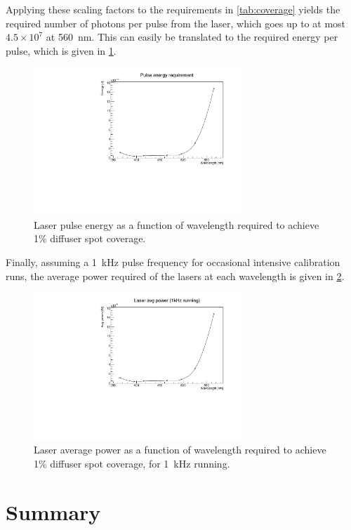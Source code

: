 \documentclass[a4paper,11pt]{article}
\begin{document}
Applying these scaling factors to the requirements in \cref{tab:coverage} yields the required number of photons per pulse from the laser, which goes up to at most $4.5\times10^7$ at 560~nm. This can easily be translated to the required energy per pulse, which is given in \cref{fig:laserenergy}.
\begin{figure}
\centering
\includegraphics[width=0.7\textwidth]{pulseEnergyReqHigh.pdf}
\caption{Laser pulse energy as a function of wavelength required to achieve 1\% diffuser spot coverage.}\label{fig:laserenergy}
\end{figure}
Finally, assuming a 1~kHz pulse frequency for occasional intensive calibration runs, the average power required of the lasers at each wavelength is given in \cref{fig:laserpower}.
\begin{figure}
\centering
\includegraphics[width=0.7\textwidth]{avgPowerReqHigh.pdf}
\caption{Laser average power as a function of wavelength required to achieve 1\% diffuser spot coverage, for 1~kHz running.}\label{fig:laserpower}
\end{figure}



\section{Summary}
\end{document}
